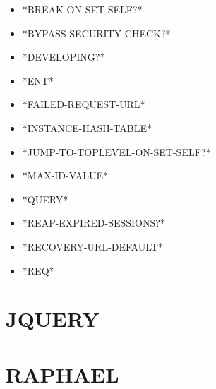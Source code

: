 \documentclass [11pt]{book}
\begin{document}
\label{subsec:variablesandconstants}



\begin{itemize}

\item {}*BREAK-ON-SET-SELF?*

\item {}*BYPASS-SECURITY-CHECK?*

\item {}*DEVELOPING?*

\item {}*ENT*

\item {}*FAILED-REQUEST-URL*

\item {}*INSTANCE-HASH-TABLE*

\item {}*JUMP-TO-TOPLEVEL-ON-SET-SELF?*

\item {}*MAX-ID-VALUE*

\item {}*QUERY*

\item {}*REAP-EXPIRED-SESSIONS?*

\item {}*RECOVERY-URL-DEFAULT*

\item {}*REQ*

\end{itemize}





\section{JQUERY }

\label{sec:jquery}







\section{RAPHAEL }

\label{sec:raphael}
\end{document}
